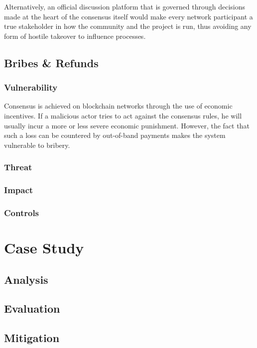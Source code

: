 \documentclass[11pt,a4paper,draft]{article}
\begin{document}
Alternatively, an official discussion platform that is governed through decisions made at the heart of the consensus itself would make every network participant a true stakeholder in how the community and the project is run, thus avoiding any form of hostile takeover to influence processes.\\

\subsection{Bribes \& Refunds}

\subsubsection{Vulnerability}

Consensus is achieved on blockchain networks through the use of economic incentives. If a malicious actor tries to act against the consensus rules, he will usually incur a more or less severe economic punishment. However, the fact that such a loss can be countered by out-of-band payments makes the system vulnerable to bribery.\\

\subsubsection{Threat}

\subsubsection{Impact}

\subsubsection{Controls}

\section{Case Study}

\subsection{Analysis}

\subsection{Evaluation}

\subsection{Mitigation}
\end{document}
